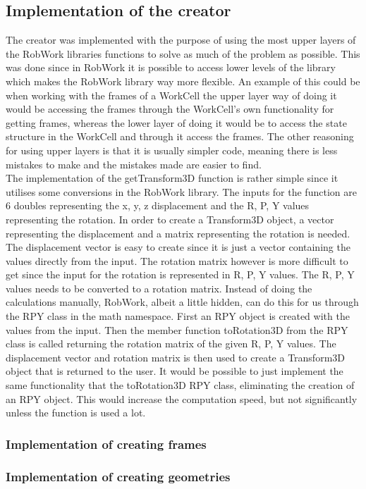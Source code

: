 \subsection{Implementation of the creator}
The creator was implemented with the purpose of using the most upper layers of the RobWork libraries functions to solve as much of the problem as possible. This was done since in RobWork it is possible to access lower levels of the library which makes the RobWork library way more flexible. An example of this could be when working with the frames of a WorkCell the upper layer way of doing it would be accessing the frames through the WorkCell's own functionality for getting frames, whereas the lower layer of doing it would be to access the state structure in the WorkCell and through it access the frames. The other reasoning for using upper layers is that it is usually simpler code, meaning there is less mistakes to make and the mistakes made are easier to find.\\

The implementation of the getTransform3D function is rather simple since it utilises some conversions in the RobWork library. The inputs for the function are 6 doubles representing the x, y, z displacement and the R, P, Y values representing the rotation. In order to create a Transform3D object, a vector representing the displacement and a matrix representing the rotation is needed. The displacement vector is easy to create since it is just a vector containing the values directly from the input. The rotation matrix however is more difficult to get since the input for the rotation is represented in R, P, Y values. The R, P, Y values needs to be converted to a rotation matrix. Instead of doing the calculations manually, RobWork, albeit a little hidden, can do this for us through the RPY class in the math namespace. First an RPY object is created with the values from the input. Then the member function toRotation3D from the RPY class is called returning the rotation matrix of the given R, P, Y values. The displacement vector and rotation matrix is then used to create a Transform3D object that is returned to the user. It would be possible to just implement the same functionality that the toRotation3D RPY class, eliminating the creation of an RPY object. This would increase the computation speed, but not significantly unless the function is used a lot.

\subsubsection{Implementation of creating frames}

\subsubsection{Implementation of creating geometries}
